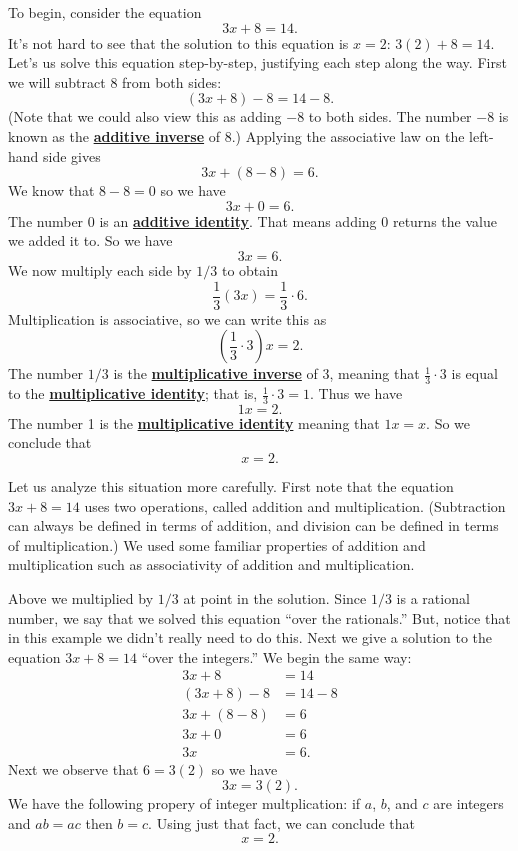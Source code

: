 \documentclass[11pt]{article}
\renewcommand\emph[1]{\underline{\bf{#1}}} %
\theoremstyle{definition}
\begin{document}
To begin, consider the equation
      \[ 3x + 8 = 14. \]
It's not hard to see that the solution to this equation is $x=2$: $3(2)+8 = 14$. Let's us solve this equation step-by-step, justifying each step along the 
way. First we will subtract $8$ from both sides:
\[ (3x+8)-8 = 14 -8.\]
(Note that we could also view this as adding $-8$ to both sides. The number $-8$ is known as the \emph{additive inverse} of $8$.) Applying the associative 
law on the left-hand side gives
\[ 3x + (8-8) = 6.\]
We know that $8-8=0$ so we have
\[ 3x + 0 = 6.\]
The number 0 is an \emph{additive identity}. That means adding 0 returns the value we added it to. So we have
\[ 3x = 6.\]
We now multiply each side by $1/3$ to obtain
\[ \frac{1}{3}(3x) = \frac{1}{3}\cdot 6. \]
Multiplication is associative, so we can write this as
\[ \left( \frac{1}{3}\cdot 3 \right)x = 2. \]
The number $1/3$ is the \emph{multiplicative inverse} of $3$, meaning that $\frac{1}{3}\cdot 3$ is equal to the \emph{multiplicative identity}; that is, $\frac{1}{3}\cdot 3 = 1$. Thus we have
\[ 1x = 2.\]
The number 1 is the \emph{multiplicative identity} meaning that $1x = x$. So we conclude that
\[ x = 2.\]

Let us analyze this situation more carefully. First note that the equation $3x+8 = 14$ uses two operations, called addition and multiplication. 
(Subtraction can always be defined in terms of addition, and division can be defined in terms of multiplication.)
We used some familiar properties of addition and multiplication such as associativity of addition and multiplication.

Above we multiplied by $1/3$ at point in the solution. Since $1/3$ is a rational number, we say that we solved this equation ``over the
rationals.'' But, notice that in this example we didn't really need to do this. Next we give a solution to the equation $3x+8=14$ ``over the
integers.'' We begin the same way:
\begin{align*}
  3x + 8 &= 14\\
 (3x+8)-8 &= 14 -8\\
 3x + (8-8) &= 6\\
 3x + 0 &= 6\\
 3x &= 6.
\end{align*}
Next we observe that $6 = 3(2)$ so we have
\[ 3x = 3(2).\]
We have the following propery of integer multplication: if $a$, $b$, and $c$ are integers and $ab=ac$ then $b=c$. Using just that fact, we can conclude that
\[ x = 2.\]
\end{document}
